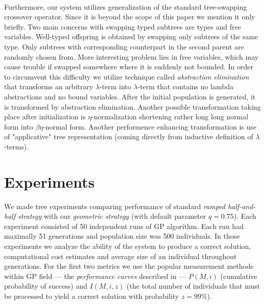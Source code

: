 \documentclass{llncs}
\newcommand{\lterm}{$\lambda$-term\xspace}
\newcommand{\lterms}{$\lambda$-terms\xspace}
\begin{document}
~\\
Furthermore, our system utilizes generalization of the standard 
tree-swapping crossover operator. Since it is beyond the scope of this 
paper we mention it only briefly. Two main concerns with swapping typed subtrees 
are types and free variables. Well-typed offspring is obtained 
by swapping only subtrees of the same type. Only subtrees with 
corresponding counterpart in the second parent are randomly chosen from.
More interesting problem lies in free variables, which may cause trouble
if swapped somewhere where it is suddenly not bounded. In order to circumvent this
difficulty we utilize technique called \textit{abstraction elimination}\cite{jones87}
that transforms an arbitrary \lterm into \lterm that contains no lambda abstractions
and no bound variables. After the initial population is generated,  it is transformed
by abstraction elimination. Another possible transformation taking place
after initialization is $\eta$-normalization shortening 
rather long long normal form into $\beta\eta$-normal form.  
Another performence enhancing transformation is use of "applicative" tree 
representation (coming directly from inductive definition of \lterms). 


\section{Experiments}
\label{experiments}

We made tree experiments comparing performance of standard 
\textit{ramped half-and-half strategy} with our
\textit{geometric strategy} (with default parameter $q=0.75$). 
Each experiment consisted of 50 independent runs 
of GP algorithm. Each run had maximally 51 generations and population size
was 500 individuals.
In those experiments we analyze the ability of the system to produce 
a correct solution, computational cost estimates and average size 
of an individual throughout generations. 
For the first two metrics we use the popular measurement  
methods within GP field --- the \textit{performance curves}
described in \cite{koza92} --- $P(M,i)$ (cumulative probability of success) 
and $I(M,i,z)$ (the total number of individuals that must be processed 
to yield a correct solution with probability $z =99\%$).
\end{document}
